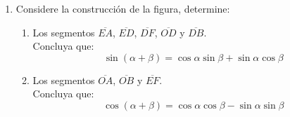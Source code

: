 \documentclass[letterpaper,11pt]{article}
\begin{document}
\begin{enumerate}

        

\item Considere la construcción de la figura, determine:

\begin{multicols}{2}
    \begin{figure}[H]
        \centering
        
    \end{figure}
    \columnbreak
    \begin{enumerate}
        \item Los segmentos $\overline{EA}$, $\overline{ED}$, $\overline{DF}$, $\overline{OD}$ y $\overline{DB}$.\\
        Concluya que:
        $$\sin\left(\alpha+\beta\right)=\cos\alpha\sin\beta+\sin\alpha\cos\beta$$
        
        \item Los segmentos $\overline{OA}$, $\overline{OB}$ y $\overline{EF}$.\\
        Concluya que:
        $$\cos\left(\alpha+\beta\right)=\cos\alpha\cos\beta-\sin\alpha\sin\beta$$
    \end{enumerate}
\end{multicols}


\end{enumerate}
\end{document}
